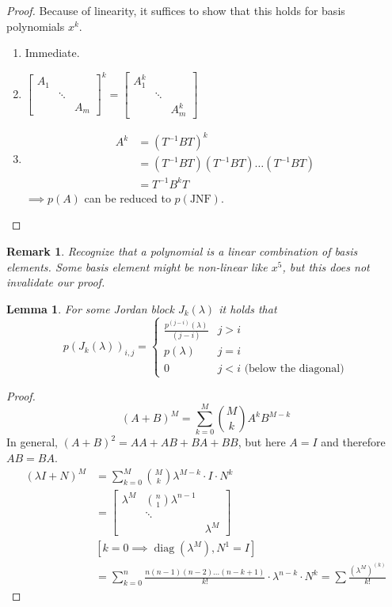 \documentclass[a4paper]{article}
\newcounter{lecref}[section]
\numberwithin{lecref}{section}
\newtheorem{lemma}[lecref]{Lemma}
\newtheorem*{Remark}{Remark}
\DeclareMathOperator{\diag}{diag}
\begin{document}
\begin{proof}
  Because of linearity, it suffices to show that this holds for basis polynomials $x^k$.
  \begin{enumerate}
    \item Immediate.
    \item $\begin{bmatrix} A_1 & & \\ & \ddots & \\ & & A_m \end{bmatrix}^k = \begin{bmatrix} A_1^k & & \\ & \ddots & \\ & & A_m^k \end{bmatrix}$
    \item
      \begin{align*}
        A^k &= (T^{-1} BT)^k \\
            &= (T^{-1} BT)(T^{-1} BT) \dots (T^{-1} BT) \\
            &= T^{-1} B^k T
      \end{align*}
      $\implies p(A)$ can be reduced to $p(\text{JNF})$.
  \end{enumerate}
\end{proof}

\begin{Remark}
  Recognize that a polynomial is a linear combination of basis elements.
  Some basis element might be non-linear like $x^5$, but this does not invalidate our proof.
\end{Remark}

\begin{lemma} %
  For some Jordan block $J_k(\lambda)$ it holds that
  \[
    p(J_k(\lambda))_{i,j} = \begin{cases}
      \frac{p^{(j - i)}(\lambda)}{(j - i)} & j > i \\
      p(\lambda) & j = i \\
      0 & j < i \text{ (below the diagonal)}
    \end{cases}
  \]
\end{lemma}

\begin{proof}
  \[ (A + B)^M = \sum_{k=0}^M {M \choose k} A^k B^{M - k} \]
  In general, $(A + B)^2 = AA + AB + BA + BB$, but here $A = I$ and therefore $AB = BA$.
  \begin{align*}
    (\lambda I + N)^M
      &= \sum_{k=0}^M {M \choose k} \lambda^{M-k} \cdot I \cdot N^k \\
      &= \begin{bmatrix} \lambda^M & {n \choose 1} \lambda^{n-1} & \\ & \ddots & \\ & & \lambda^M \end{bmatrix} \\
      &[k=0 \implies \diag(\lambda^M), N^1 = I] \\
      &= \sum_{k=0}^n \frac{n (n-1)(n-2) \dots (n-k+1)}{k!} \cdot \lambda^{n-k} \cdot N^k = \sum \frac{(\lambda^M)^{(k)}}{k!}
  \end{align*}
\end{proof}
\end{document}
